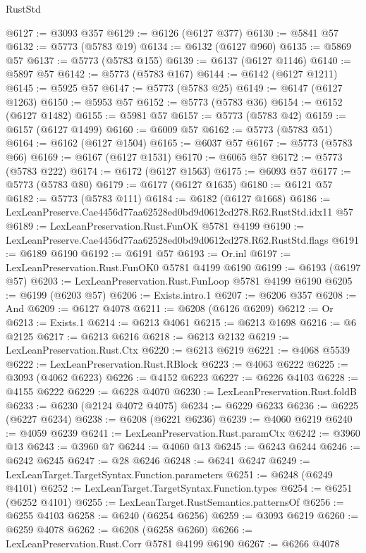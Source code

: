 \begin{lexlean}{RustStd}
\begin{coremodule}
@6127 := @3093 @357
@6129 := @6126 (@6127 @377)
@6130 := @5841 @57
@6132 := @5773 (@5783 @19)
@6134 := @6132 (@6127 @960)
@6135 := @5869 @57
@6137 := @5773 (@5783 @155)
@6139 := @6137 (@6127 @1146)
@6140 := @5897 @57
@6142 := @5773 (@5783 @167)
@6144 := @6142 (@6127 @1211)
@6145 := @5925 @57
@6147 := @5773 (@5783 @25)
@6149 := @6147 (@6127 @1263)
@6150 := @5953 @57
@6152 := @5773 (@5783 @36)
@6154 := @6152 (@6127 @1482)
@6155 := @5981 @57
@6157 := @5773 (@5783 @42)
@6159 := @6157 (@6127 @1499)
@6160 := @6009 @57
@6162 := @5773 (@5783 @51)
@6164 := @6162 (@6127 @1504)
@6165 := @6037 @57
@6167 := @5773 (@5783 @66)
@6169 := @6167 (@6127 @1531)
@6170 := @6065 @57
@6172 := @5773 (@5783 @222)
@6174 := @6172 (@6127 @1563)
@6175 := @6093 @57
@6177 := @5773 (@5783 @80)
@6179 := @6177 (@6127 @1635)
@6180 := @6121 @57
@6182 := @5773 (@5783 @111)
@6184 := @6182 (@6127 @1668)
@6186 := LexLeanPreserve.Cae4456d77aa62528ed0bd9d0612cd278.R62.RustStd.idx11 @57
@6189 := LexLeanPreservation.Rust.FunOK @5781 @4199
@6190 := LexLeanPreserve.Cae4456d77aa62528ed0bd9d0612cd278.R62.RustStd.flags
@6191 := @6189 @6190
@6192 := @6191 @57
@6193 := Or.inl
@6197 := LexLeanPreservation.Rust.FunOK0 @5781 @4199 @6190
@6199 := @6193 (@6197 @57)
@6203 := LexLeanPreservation.Rust.FunLoop @5781 @4199 @6190
@6205 := @6199 (@6203 @57)
@6206 := Exists.intro.{1}
@6207 := @6206 @357
@6208 := And
@6209 := @6127 @4078
@6211 := @6208 (@6126 @6209)
@6212 := Or
@6213 := Exists.{1}
@6214 := @6213 @4061
@6215 := @6213 @1698
@6216 := @6 @2125
@6217 := @6213 @6216
@6218 := @6213 @2132
@6219 := LexLeanPreservation.Rust.Ctx
@6220 := @6213 @6219
@6221 := @4068 @5539
@6222 := LexLeanPreservation.Rust.RBlock
@6223 := @4063 @6222
@6225 := @3093 (@4062 @6223)
@6226 := @4152 @6223
@6227 := @6226 @4103
@6228 := @4155 @6222
@6229 := @6228 @4070
@6230 := LexLeanPreservation.Rust.foldB
@6233 := @6230 (@2124 @4072 @4075)
@6234 := @6229 @6233
@6236 := @6225 (@6227 @6234)
@6238 := @6208 (@6221 @6236)
@6239 := @4060 @6219
@6240 := @4059 @6239
@6241 := LexLeanPreservation.Rust.paramCtx
@6242 := @3960 @13
@6243 := @3960 @7
@6244 := @4060 @13
@6245 := @6243 @6244
@6246 := @6242 @6245
@6247 := @28 @6246
@6248 := @6241 @6247
@6249 := LexLeanTarget.TargetSyntax.Function.parameters
@6251 := @6248 (@6249 @4101)
@6252 := LexLeanTarget.TargetSyntax.Function.types
@6254 := @6251 (@6252 @4101)
@6255 := LexLeanTarget.RustSemantics.patternsOf
@6256 := @6255 @4103
@6258 := @6240 (@6254 @6256)
@6259 := @3093 @6219
@6260 := @6259 @4078
@6262 := @6208 (@6258 @6260)
@6266 := LexLeanPreservation.Rust.Corr @5781 @4199 @6190
@6267 := @6266 @4078

\end{coremodule}
\end{lexlean}
